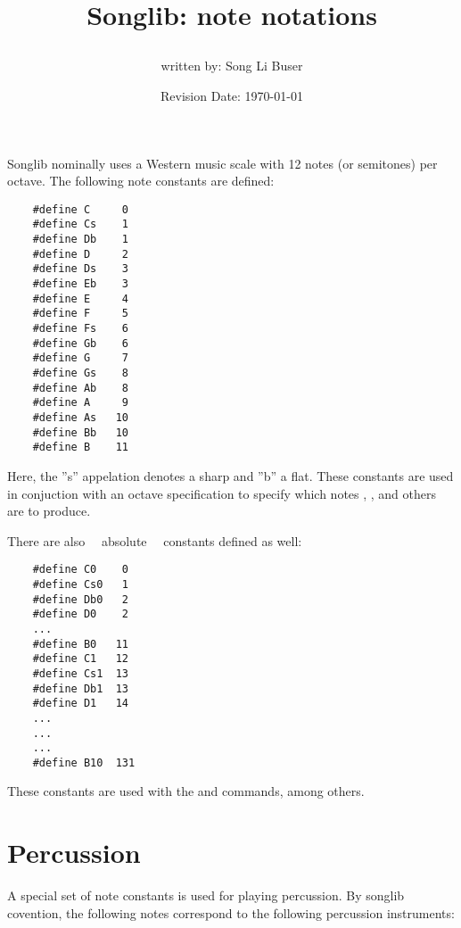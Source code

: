 \documentclass{article}
\title{Songlib: note notations\\
\date{Revision Date: \today}}
\author{written by: Song Li Buser}
\begin{document}
\maketitle

\W\subsubsection*{}
\W\htmlrule

Songlib nominally uses a Western music scale with 12 notes (or semitones)
per octave. The following note constants are defined:

\begin{verbatim}
    #define C     0
    #define Cs    1
    #define Db    1
    #define D     2
    #define Ds    3
    #define Eb    3
    #define E     4
    #define F     5
    #define Fs    6
    #define Gb    6
    #define G     7
    #define Gs    8
    #define Ab    8
    #define A     9
    #define As   10
    #define Bb   10
    #define B    11
\end{verbatim}

Here, the ''s'' appelation denotes a sharp and ''b'' a flat.
These constants are used in conjuction with an octave specification
to specify which notes , , and others
are to produce.

There are also ~~absolute~~ constants defined as well:

\begin{verbatim}
    #define C0    0
    #define Cs0   1
    #define Db0   2
    #define D0    2
    ...
    #define B0   11
    #define C1   12
    #define Cs1  13
    #define Db1  13
    #define D1   14
    ...
    ...
    ...
    #define B10  131
\end{verbatim}

These constants are
used with the
 and 
commands,
among others.

\section{Percussion}

A special set of note constants is used for playing
percussion. By songlib covention, the following notes
correspond to the following percussion instruments:
\end{document}
